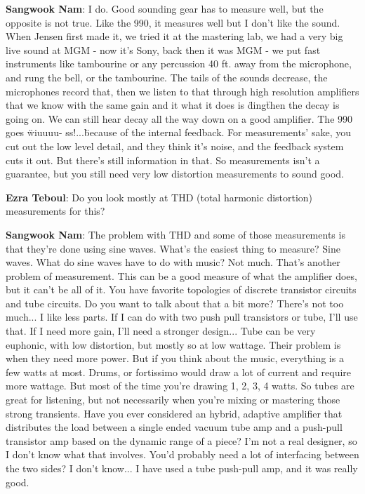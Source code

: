 \textbf{Sangwook Nam}: I do. Good sounding gear has to measure well, but the opposite is not true. Like the 990, it measures well but I don't like the sound. When Jensen first made it, we tried it at the mastering lab, we had a very big live sound at MGM - now it's Sony, back then it was MGM - we put fast instruments like tambourine or any percussion 40 ft. away from the microphone, and rung the bell, or the tambourine. The tails of the sounds decrease, the microphones record that, then we listen to that through high resolution amplifiers that we know with the same gain and it what it does is \"ding\" then the decay is going on. We can still hear decay all the way down on a good amplifier. The 990 goes \"wiuuuu- ss!...\" because of the internal feedback. For measurements' sake, you cut out the low level detail, and they think it's noise, and the feedback system cuts it out. But there's still information in that. So measurements isn't a guarantee, but you still need very low distortion measurements to sound good.

\textbf{Ezra Teboul}: Do you look mostly at THD (total harmonic distortion) measurements for this?

\textbf{Sangwook Nam}: The problem with THD and some of those measurements is that they're done using sine waves. What's the easiest thing to measure? Sine waves. What do sine waves have to do with music? Not much. That's another problem of measurement. This can be a good measure of what the amplifier does, but it can't be all of it.
You have favorite topologies of discrete transistor circuits and tube circuits. Do you want to talk about that a bit more?
There's not too much... I like less parts. If I can do with two push pull transistors or tube, I'll use that. If I need more gain, I'll need a stronger design... Tube can be very euphonic, with low distortion, but mostly so at low wattage. Their problem is when they need more power. But if you think about the music, everything is a few watts at most. Drums, or fortissimo would draw a lot of current and require more wattage. But most of the time you're drawing 1, 2, 3, 4 watts. So tubes are great for listening, but not necessarily when you're mixing or mastering those strong transients.
Have you ever considered an hybrid, adaptive amplifier that distributes the load between a single ended vacuum tube amp and a push-pull transistor amp based on the dynamic range of a piece?
I'm not a real designer, so I don't know what that involves. You'd probably need a lot of interfacing between the two sides? I don't know... I have used a tube push-pull amp, and it was really good.

